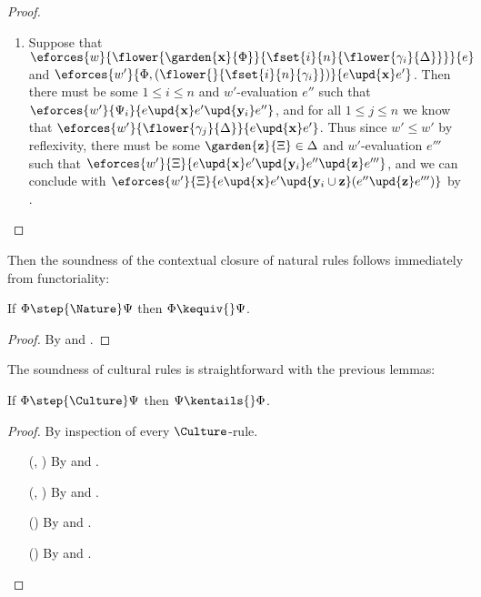 \begin{proof}
\begin{itemize}
\begin{enumerate}
        \item Suppose that
        $\eforces{w}{\flower{\garden{\bx}{\Phi}}{{\fset{i}{n}{\flower{\gamma_i}{\Delta}}}}}{e}$
        and $\eforces{w'}{\Phi,(\flower{}{\fset{i}{n}{\gamma_i}})}{e \upd{\bx}
        e'}$. Then there must be some $1 \leq i \leq n$ and $w'$-evaluation
        $e''$ such that $\eforces{w'}{\Psi_i}{e \upd{\bx} e' \upd{\by_i} e''}$,
        and for all $1 \leq j \leq n$ we know that
        $\eforces{w'}{\flower{\gamma_j}{\Delta}}{e \upd{\bx} e'}$. Thus since
        $w' \leq w'$ by reflexivity, there must be some $\garden{\bz}{\Xi} \in
        \Delta$ and $w'$-evaluation $e'''$ such that $\eforces{w'}{\Xi}{e
        \upd{\bx} e' \upd{\by_i} e'' \upd{\bz} e'''}$, and we can conclude with
        $\eforces{w'}{\Xi}{e \upd{\bx} e' \upd{\by_i \cup \bz} (e'' \upd{\bz}
        e''')}$ by .
      \end{enumerate} 
  \end{itemize}
\end{proof}

Then the soundness of the contextual closure of natural rules follows
immediately from functoriality:

\begin{lemma}
  If $\Phi \step{\Nature} \Psi$ then $\Phi \kequiv{} \Psi$.
\end{lemma}
\begin{proof}
  By  and .
\end{proof}

The soundness of cultural rules is straightforward with the previous lemmas:

\begin{lemma}
  If $\Phi \step{\Culture} \Psi$ then $\Psi \kentails{}\Phi$.
\end{lemma}
\begin{proof}
  By inspection of every $\Culture$-rule.
  \begin{itemize}
    \item[(\rsf{grow}, \rsf{crop})] By  and
    .
    
    \item[(\rsf{pull}, \rsf{glue})] By  and
    .
    
    \item[(\rsf{apis})] By  and .

    \item[(\rsf{apet})] By  and .
  \end{itemize}
\end{proof}

